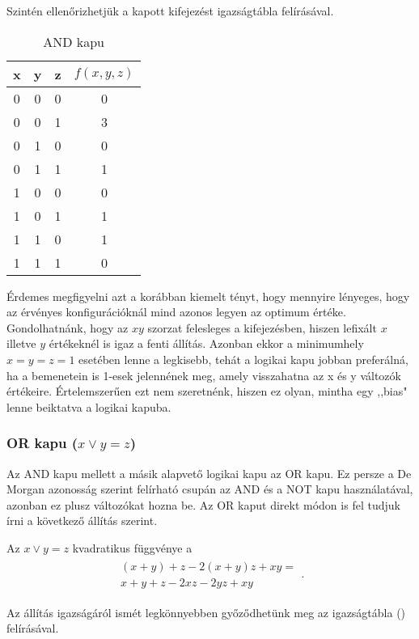 Szintén ellenőrizhetjük a kapott kifejezést igazságtábla felírásával. 
\begin{table}[ht]
	\footnotesize
	\centering
	\begin{tabular}{ c c c c }
		\toprule
		x & y & z & $f(x,y,z)$ \\
		\midrule
		0 & 0 & 0 & 0 \\
		0 & 0 & 1 & 3 \\
		0 & 1 & 0 & 0 \\
		0 & 1 & 1 & 1 \\
		1 & 0 & 0 & 0 \\
		1 & 0 & 1 & 1 \\
		1 & 1 & 0 & 1 \\
		1 & 1 & 1 & 0 \\		
		\bottomrule
	\end{tabular}
	\caption{AND kapu}
	\label{tab:ANDgate}
\end{table}


Érdemes megfigyelni azt a korábban kiemelt tényt, hogy mennyire lényeges, hogy az érvényes konfigurációknál mind azonos legyen az optimum értéke. Gondolhatnánk, hogy az $xy$ szorzat felesleges a kifejezésben, hiszen lefixált $x$ illetve $y$ értékeknél is igaz a fenti állítás. Azonban ekkor a minimumhely $x=y=z=1$ esetében lenne a legkisebb, tehát a logikai kapu jobban preferálná, ha a bemenetein is 1-esek jelennének meg, amely visszahatna az x és y változók értékeire. Értelemszerűen ezt nem szeretnénk, hiszen ez olyan, mintha egy ,,bias" lenne beiktatva a logikai kapuba.


\subsubsection{OR kapu ($x \vee y = z$)}

Az AND kapu mellett a másik alapvető logikai kapu az OR kapu. Ez persze a De Morgan azonosság szerint felírható csupán az AND és a NOT kapu használatával, azonban ez plusz változókat hozna be. Az OR kaput direkt módon is fel tudjuk írni a következő állítás szerint. 

\begin{allitas}
	Az $x \vee y = z$ kvadratikus függvénye a 
	\begin{align}
		\begin{split}
			(x+y)+z-2(x+y)z+xy = \\
			x+y+z-2xz-2yz+xy
		\end{split}.
	\end{align}

	Az állítás igazságáról ismét legkönnyebben győződhetünk meg az igazságtábla () felírásával.
\end{allitas}

